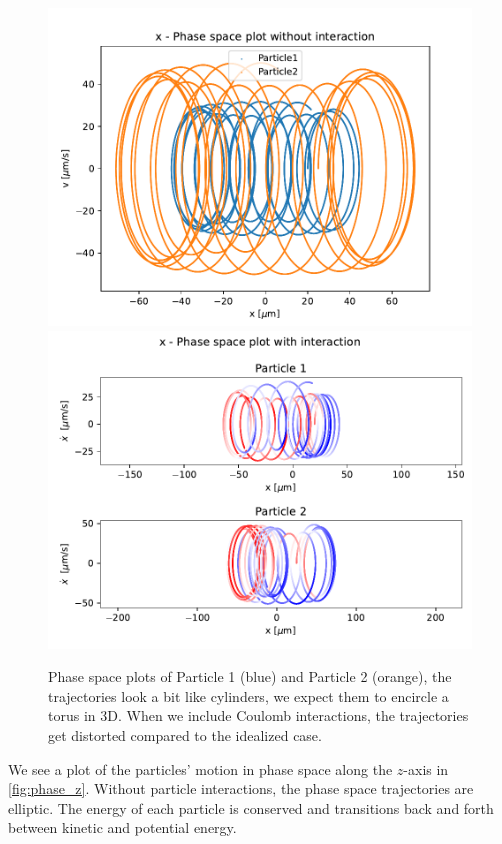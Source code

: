\begin{figure}
\centering
\includegraphics[scale = 0.7]{../figures/x_phase_noint.pdf}
\includegraphics[scale = 0.7]{../figures/x_phase_int.pdf}
\caption{Phase space plots of Particle 1 (blue) and Particle 2 (orange), the trajectories look a bit like cylinders,
we expect them to encircle a torus in 3D.
When we include Coulomb interactions, the trajectories get distorted compared to the idealized case.}
\label{fig:phase_x}
\end{figure}


We see a plot of the particles' motion in phase space along the $z$-axis in \autoref{fig:phase_z}. Without particle interactions, the phase space trajectories are
elliptic. The energy of each particle is conserved and transitions back and forth
between kinetic and potential energy.

